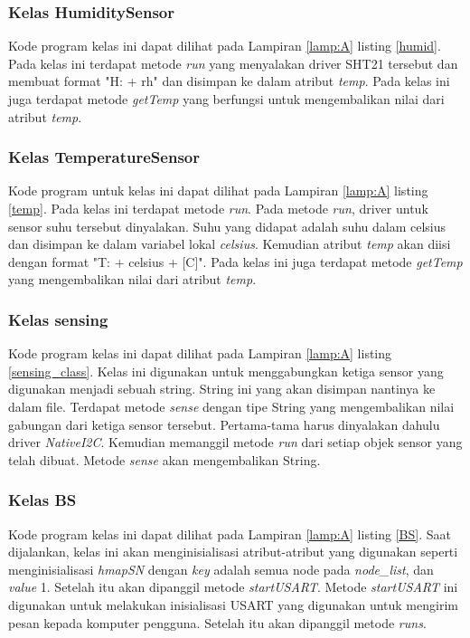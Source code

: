 \subsubsection{Kelas HumiditySensor}
Kode program kelas ini dapat dilihat pada Lampiran \ref{lamp:A} listing \ref{humid}. Pada kelas ini terdapat metode \textit{run} yang menyalakan driver SHT21 tersebut dan membuat format "H: + rh" dan disimpan ke dalam atribut \textit{temp}. Pada kelas ini juga terdapat metode \textit{getTemp} yang berfungsi untuk mengembalikan nilai dari atribut \textit{temp}.

\subsubsection{Kelas TemperatureSensor}
Kode program untuk kelas ini dapat dilihat pada Lampiran \ref{lamp:A} listing \ref{temp}. Pada kelas ini terdapat metode \textit{run}. Pada metode \textit{run}, driver untuk sensor suhu tersebut dinyalakan. Suhu yang didapat adalah suhu dalam celsius dan disimpan ke dalam variabel lokal \textit{celsius}. Kemudian atribut \textit{temp} akan diisi dengan format "T: + celsius + [C]". Pada kelas ini juga terdapat metode \textit{getTemp} yang mengembalikan nilai dari atribut \textit{temp}.

\subsubsection{Kelas sensing}
Kode program kelas ini dapat dilihat pada Lampiran \ref{lamp:A} listing \ref{sensing_class}. Kelas ini digunakan untuk menggabungkan ketiga sensor yang digunakan menjadi sebuah string. String ini yang akan disimpan nantinya ke dalam file. Terdapat metode \textit{sense} dengan tipe String yang mengembalikan nilai gabungan dari ketiga sensor tersebut. Pertama-tama harus dinyalakan dahulu driver \textit{NativeI2C}. Kemudian memanggil metode \textit{run} dari setiap objek sensor yang telah dibuat. Metode \textit{sense} akan mengembalikan String.

\subsubsection{Kelas BS}
Kode program kelas ini dapat dilihat pada Lampiran \ref{lamp:A} listing \ref{BS}. Saat dijalankan, kelas ini akan menginisialisasi atribut-atribut yang digunakan seperti menginisialisasi \textit{hmapSN} dengan \textit{key} adalah semua node pada \textit{node\_list}, dan \textit{value} 1. Setelah itu akan dipanggil metode \textit{startUSART}. Metode \textit{startUSART} ini digunakan untuk melakukan inisialisasi USART yang digunakan untuk mengirim pesan kepada komputer pengguna. Setelah itu akan dipanggil metode \textit{runs}. 

